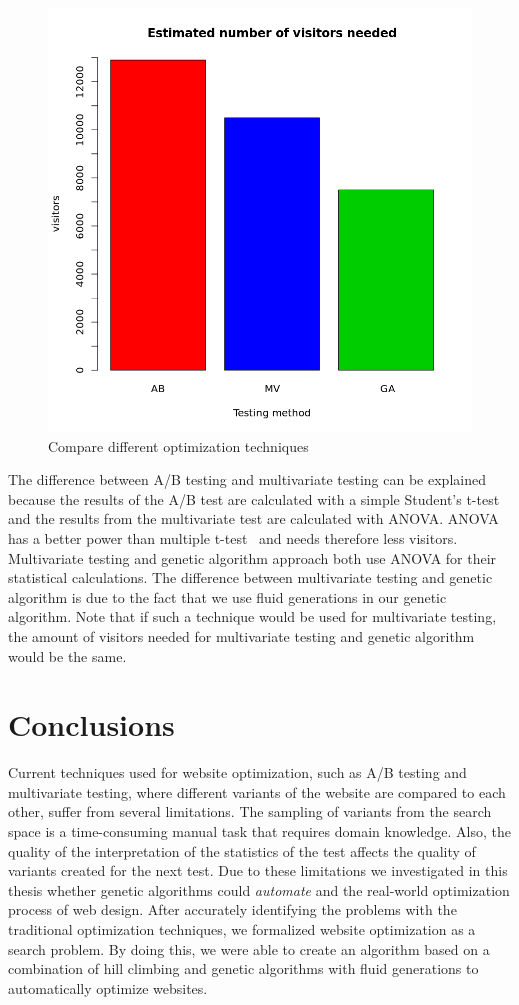 \documentclass{report}
\begin{document}
\begin{figure}[ht]
	\centering
	\includegraphics[width=0.8\linewidth]{imgs/comparesota.png}
	\caption{Compare different optimization techniques}
	\label{fig:comparesota}
\end{figure}
\FloatBarrier

The difference between A/B testing and multivariate testing can be explained because the results of the A/B test are calculated with a simple Student's t-test and the results from the multivariate test are calculated with ANOVA. ANOVA has a better power than multiple t-test~\cite{miller2013analysis} and needs therefore less visitors. Multivariate testing and genetic algorithm approach both use ANOVA for their statistical calculations. The difference between multivariate testing and genetic algorithm is due to the fact that we use fluid generations in our genetic algorithm. Note that if such a technique would be used for multivariate testing, the amount of visitors needed for multivariate testing and genetic algorithm would be the same.



\chapter{Conclusions}
Current techniques used for website optimization, such as A/B testing and multivariate testing, where different variants of the website are compared to each other, suffer from several limitations. The sampling of variants from the search space is a time-consuming manual task that requires domain knowledge. Also, the quality of the interpretation of the statistics of the test affects  the quality of variants created for the next test. Due to these limitations we investigated in this thesis whether genetic algorithms could \textit{automate} and  the real-world optimization process of web design. After accurately identifying the problems with the traditional optimization techniques, we formalized website optimization as a search problem. By doing this, we were able to create an algorithm based on a combination of hill climbing and genetic algorithms with fluid generations to automatically optimize websites. \\
\end{document}
